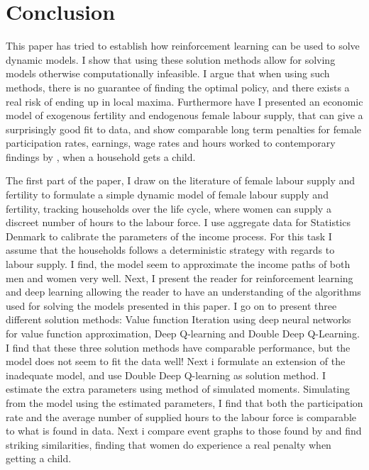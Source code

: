 \section{Conclusion}

This paper has tried to establish how reinforcement learning can be used to solve dynamic models. I show that using these solution methods allow for solving models otherwise computationally infeasible. I argue that when using such methods, there is no guarantee of finding the optimal policy, and there exists a real risk of ending up in local maxima. Furthermore have I presented an economic model of exogenous fertility and endogenous female labour supply, that can give a surprisingly good fit to data, and show comparable long term penalties for female participation rates, earnings, wage rates and hours worked to contemporary findings by \textcite{kleven_children_2019}, when a household gets a child. 

The first part of the paper, I draw on the literature of female labour supply and fertility to formulate a simple dynamic model of female labour supply and fertility, tracking households over the life cycle, where women can supply a discreet number of hours to the labour force. I use aggregate data for Statistics Denmark to calibrate the parameters of the income process. For this task I assume that the households follows a deterministic strategy with regards to labour supply. I find, the model seem to approximate the income paths of both men and women very well. Next, I present the reader for reinforcement learning and deep learning allowing the reader to have an understanding of the algorithms used for solving the models presented in this paper.  I go on to present three different solution methods: Value function Iteration using deep neural networks for value function approximation, Deep Q-learning and Double Deep Q-Learning. I find that these three solution methods have comparable performance, but the model does not seem to fit the data well! Next i formulate an extension of the inadequate model, and use Double Deep Q-learning as solution method. I estimate the extra parameters using method of simulated moments. Simulating from the model using the estimated parameters, I find that both the participation rate and the average number of supplied hours to the labour force is comparable to what is found in data. Next i compare event graphs to those found by \textcite{kleven_children_2019} and find striking similarities, finding that women do experience a real penalty when getting a child.